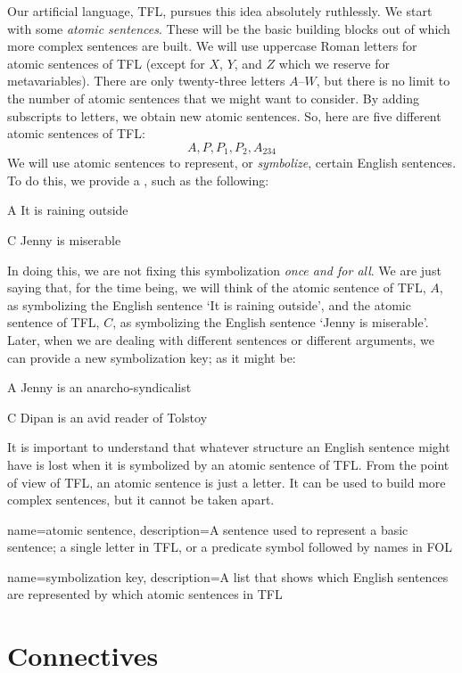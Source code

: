 Our artificial language, TFL, pursues this idea absolutely ruthlessly. We start with some \emph{atomic sentences}. These will be the basic building blocks out of which more complex sentences are built. We will use uppercase Roman letters for atomic sentences of TFL (except for $X$, $Y$, and $Z$ which we reserve for metavariables). There are only twenty-three letters $A$--$W$, but there is no limit to the number of atomic sentences that we might want to consider. By adding subscripts to letters, we obtain new atomic sentences. So, here are five different atomic sentences of TFL:
	$$A, P, P_1, P_2, A_{234}$$
We will use atomic sentences to represent, or \emph{symbolize}, certain English sentences. To do this, we provide a , such as the following:
	\begin{ekey}
		\item[A] It is raining outside
		\item[C] Jenny is miserable
	\end{ekey}
In doing this, we are not fixing this symbolization \emph{once and for all}. We are just saying that, for the time being, we will think of the atomic sentence of TFL, $A$, as symbolizing the English sentence `It is raining outside', and the atomic sentence of TFL, $C$, as symbolizing the English sentence `Jenny is miserable'. Later, when we are dealing with different sentences or different arguments, we can provide a new symbolization key; as it might be:
	\begin{ekey}
		\item[A] Jenny is an anarcho-syndicalist
		\item[C] Dipan is an avid reader of Tolstoy
	\end{ekey}
It is important to understand that whatever structure an English sentence might have is lost when it is symbolized by an atomic sentence of TFL. From the point of view of TFL, an atomic sentence is just a letter. It can be used to build more complex sentences, but it cannot be taken apart.

{
name=atomic sentence,
description={A sentence used to represent a basic sentence; a single letter in TFL, or a predicate symbol followed by names in FOL}
}

{
name=symbolization key,
description={A list that shows which English sentences are represented by which \glspl{atomic sentence} in TFL}
}

\chapter{Connectives}
\label{s:TFLConnectives}

